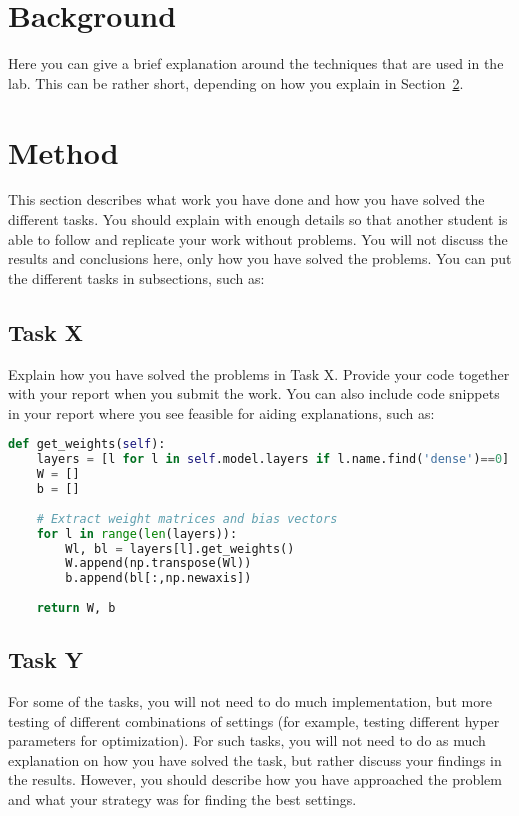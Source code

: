 \documentclass[a4paper]{article}
\newcommand{\secref}[1]{Section~\ref{sec:#1}}
\begin{document}
\section{Background}\label{sec:background}
Here you can give a brief explanation around the techniques that are used in the lab. This can be rather short, depending on how you explain in \secref{method}.

\section{Method}\label{sec:method}
This section describes what work you have done and how you have solved the different tasks. You should explain with enough details so that another student is able to follow and replicate your work without problems. You will not discuss the results and conclusions here, only how you have solved the problems. You can put the different tasks in subsections, such as:

\subsection{Task X}
Explain how you have solved the problems in Task X. Provide your code together with your report when you submit the work. You can also include code snippets in your report where you see feasible for aiding explanations, such as:

\begin{lstlisting}[language=Python]
def get_weights(self):
	layers = [l for l in self.model.layers if l.name.find('dense')==0]
	W = []
	b = []
	
	# Extract weight matrices and bias vectors
	for l in range(len(layers)):
		Wl, bl = layers[l].get_weights()
		W.append(np.transpose(Wl))
		b.append(bl[:,np.newaxis])
	
	return W, b
\end{lstlisting}

\subsection{Task Y}
For some of the tasks, you will not need to do much implementation, but more testing of different combinations of settings (for example, testing different hyper parameters for optimization). For such tasks, you will not need to do as much explanation on how you have solved the task, but rather discuss your findings in the results. However, you should describe how you have approached the problem and what your strategy was for finding the best settings.
\end{document}
